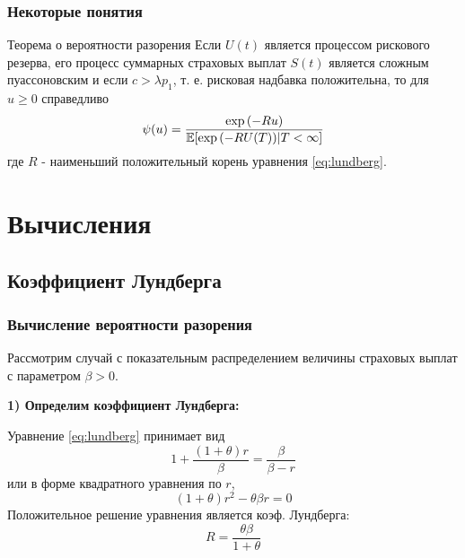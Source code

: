 \documentclass[10pt]{beamer}
\newcommand\Exp{{\rm exp \,}}
\numberwithin{equation}{section}
\begin{document}
\begin{frame}
\frametitle{Некоторые понятия}
\begin{block}{Теорема о вероятности разорения}
Если $U(t)$ является процессом рискового резерва, его процесс суммарных страховых выплат $S(t)$
является сложным пуассоновским и если $c > \lambda p_{1}$, т. е. рисковая надбавка положительна,
то для $u \geq 0$ справедливо
\begin{equation}
\psi(u) = \frac{\Exp(-Ru)}{\mathbb{E}[\Exp(-RU(T))|T < \infty]}
\end{equation}
где $R$ - наименьший положительный корень уравнения \ref{eq:lundberg}.
\end{block}
\end{frame}


\section{Вычисления}
\subsection{Коэффициент Лундберга}
\begin{frame}
\frametitle{Вычисление вероятности разорения}
\noindent
Рассмотрим случай с показательным распределением величины страховых выплат с параметром $\beta > 0$.

\noindent
\textbf{1) Определим коэффициент Лундберга:}

\noindent
Уравнение \ref{eq:lundberg} принимает вид
\begin{equation}
1 + \frac{(1 + \theta)r}{\beta}=\frac{\beta}{\beta-r}
\end{equation}
или в форме квадратного уравнения по $r$,
\begin{equation}
(1 + \theta)r^2 - \theta\beta r = 0
\end{equation}
Положительное решение уравнения является коэф. Лундберга:
\begin{equation}
R = \frac{\theta\beta}{1 + \theta}
\end{equation}
\end{frame}
\end{document}
